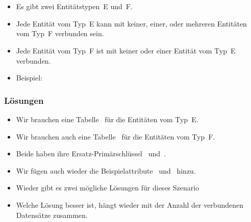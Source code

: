 %
\section{}%
%
\begin{frame}[t]%
\frametitle{}%
\begin{itemize}%
\item Es gibt zwei Entitätstypen~E und~F.%
\item<2-> Jede Entität vom Typ~E kann mit keiner, einer, oder mehreren Entitäten vom Typ~F verbunden sein.
\item<3-> Jede Entität vom Typ~F ist mit keiner oder einer Entität vom Typ~E verbunden.
\item<4-> Beispiel:%
\end{itemize}%
%
%
\end{frame}%
%
\begin{frame}%
\frametitle{Lösungen}%
\begin{itemize}%
\item Wir brauchen eine Tabelle~ für die Entitäten vom Typ~E.%
%
\item<2->  Wir brauchen auch eine Tabelle~ für die Entitäten vom Typ~F.%
%
\item<3-> Beide haben ihre Ersatz-Primärschlüssel~ und~.%
%
\item<4-> Wir fügen auch wieder die Beispielattribute~ und~ hinzu.%
%
\item<5-> Wieder gibt es zwei mögliche Lösungen für dieses Szenario%
%
\item<8-> Welche Lösung besser ist, hängt wieder mit der Anzahl der verbundenen Datensätze zusammen.
\end{itemize}%
\end{frame}%
%

